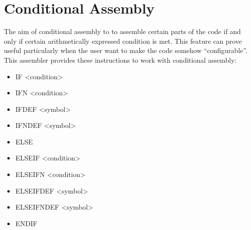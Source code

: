 \documentclass[a4paper,twoside,12pt]{book}
\begin{document}
	\section{Conditional Assembly}
		The aim of conditional assembly to to assemble certain parts of the code if and only if certain arithmetically expressed condition is met. This feature can prove useful particularly when the user want to make the code somehow ``configurable''. This assembler provides these instructions to work with conditional assembly:
		\begin{itemize}
			\setlength{\itemsep}{-3pt}
			\item IF <condition>
			\item IFN <condition>
			\item IFDEF <symbol>
			\item IFNDEF <symbol>
			\item ELSE
			\item ELSEIF <condition>
			\item ELSEIFN <condition>
			\item ELSEIFDEF <symbol>
			\item ELSEIFNDEF <symbol>
			\item ENDIF
		\end{itemize}
\end{document}
